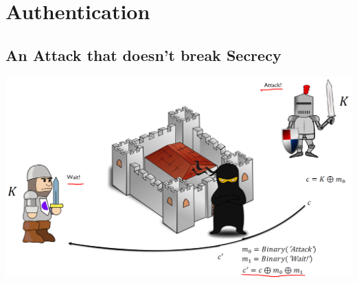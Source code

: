 

\chapter{Authentication}
	
\section{An Attack that doesn’t break Secrecy}
	\begin{center}
		\includegraphics[width=140mm]{Graphics/Authentication/a1.png}
	\end{center}

